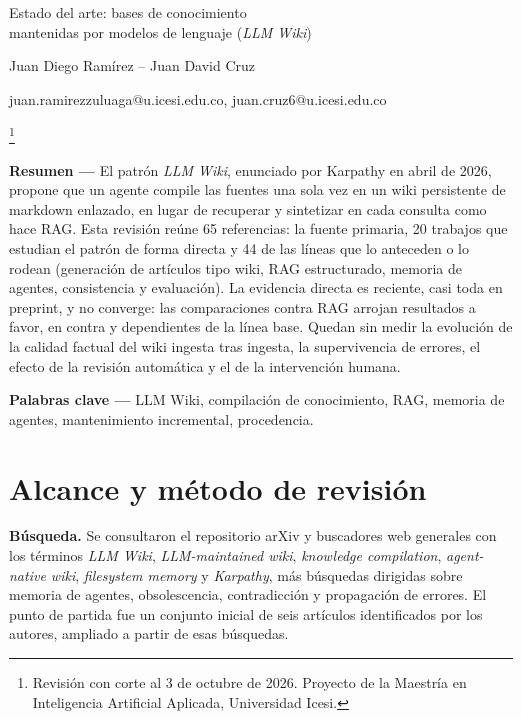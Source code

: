 \documentclass[11pt,letterpaper]{article}
\newcommand{\notasinmarca}[1]{%
  \begingroup\renewcommand{\thefootnote}{}\footnote{#1}\addtocounter{footnote}{-1}\endgroup}
\begin{document}
\thispagestyle{fancy}

\begin{center}
{\LARGE Estado del arte: bases de conocimiento\\[2pt]
mantenidas por modelos de lenguaje (\emph{LLM Wiki})\par}
\vspace{18pt}
{\large Juan Diego Ramírez -- Juan David Cruz\par}
\vspace{4pt}
{\ttfamily\small juan.ramirezzuluaga@u.icesi.edu.co, juan.cruz6@u.icesi.edu.co\par}
\end{center}

\vspace{14pt}

\notasinmarca{Revisión con corte al 3 de octubre de 2026. Proyecto de la Maestría en Inteligencia Artificial Aplicada, Universidad Icesi.}

\noindent\textbf{Resumen —} El patrón \emph{LLM Wiki}, enunciado por Karpathy en abril de 2026, propone que un agente compile las fuentes una sola vez en un wiki persistente de markdown enlazado, en lugar de recuperar y sintetizar en cada consulta como hace RAG. Esta revisión reúne 65 referencias: la fuente primaria, 20 trabajos que estudian el patrón de forma directa y 44 de las líneas que lo anteceden o lo rodean (generación de artículos tipo wiki, RAG estructurado, memoria de agentes, consistencia y evaluación). La evidencia directa es reciente, casi toda en preprint, y no converge: las comparaciones contra RAG arrojan resultados a favor, en contra y dependientes de la línea base. Quedan sin medir la evolución de la calidad factual del wiki ingesta tras ingesta, la supervivencia de errores, el efecto de la revisión automática y el de la intervención humana.

\vspace{6pt}
\noindent\textbf{Palabras clave —} LLM Wiki, compilación de conocimiento, RAG, memoria de agentes, mantenimiento incremental, procedencia.

\section{Alcance y método de revisión}

\textbf{Búsqueda.} Se consultaron el repositorio arXiv y buscadores web generales con los términos \emph{LLM Wiki}, \emph{LLM-maintained wiki}, \emph{knowledge compilation}, \emph{agent-native wiki}, \emph{filesystem memory} y \emph{Karpathy}, más búsquedas dirigidas sobre memoria de agentes, obsolescencia, contradicción y propagación de errores. El punto de partida fue un conjunto inicial de seis artículos identificados por los autores, ampliado a partir de esas búsquedas.
\end{document}
